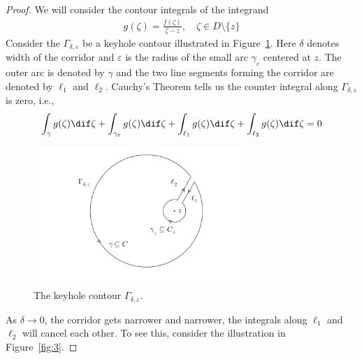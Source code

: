 \documentclass[thmcnt=section, color=cyan, 12pt]{my-elegantbook}
\begin{document}
\begin{proof}
	We will consider the contour integrals of the integrand
	\begin{align*}
		g(\zeta) = \frac{f(\zeta)}{\zeta - z}, \quad \zeta \in D \setminus \{z\}
	\end{align*}
	Consider the $\Gamma_{\delta, \varepsilon}$ be a keyhole contour illustrated
	in Figure~\ref{fig:2}.
	Here $\delta$ denotes width of the corridor and $\varepsilon$
	is the radius of the small arc $\gamma_{\varepsilon}$ centered at $z$.
	The outer arc is denoted by $\gamma$ and the two line segments forming the corridor
	are denoted by $\ell_1$ and $\ell_2$.
	Cauchy's Theorem tells us the counter integral
	along $\Gamma_{\delta, \varepsilon}$ is zero, i.e.,
	\begin{align}
		\int_\gamma g(\zeta) \dif \zeta
		+ \int_{\gamma_{\varepsilon}} g(\zeta) \dif \zeta
		+ \int_{\ell_1} g(\zeta) \dif \zeta
		+ \int_{\ell_2} g(\zeta) \dif \zeta
		= 0
		\label{eq:9}
	\end{align}

	\begin{figure}[H]
		\centering
		\includegraphics[width=0.7\textwidth]{figures/keyhole-for-proving-the-cauchy-integral-formula.png}
		\caption{The keyhole contour $\Gamma_{\delta, \varepsilon}$.}
		\label{fig:2}
	\end{figure}

	As $\delta \to 0$,
	the corridor gets narrower and narrower,
	the integrals along $\ell_1$ and $\ell_2$
	will cancel each other.
	To see this, consider the illustration in Figure~\ref{fig:3}.


\end{proof}
\end{document}
